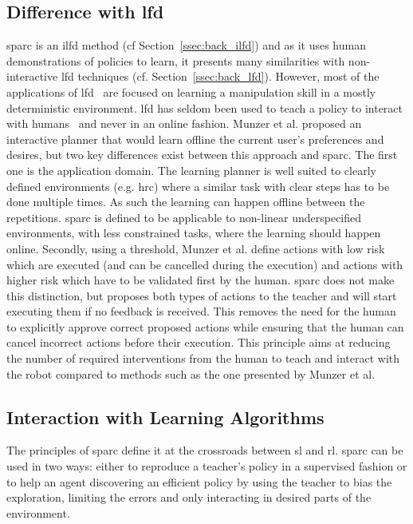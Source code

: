 \subsection{Difference with \gls{lfd}}

\gls{sparc} is an \gls{ilfd} method (cf Section~\ref{ssec:back_ilfd}) and as it uses human demonstrations of policies to learn, it presents many similarities with non-interactive \gls{lfd} techniques (cf. Section~\ref{ssec:back_lfd}). However, most of the applications of \gls{lfd}~\citep{argall2009survey,billard2008robot} are focused on learning a manipulation skill in a mostly deterministic environment. \gls{lfd} has seldom been used to teach a policy to interact with humans~\citep{liu2014train,sequeira2016discovering,munzer2017efficient} and never in an online fashion. Munzer et al. proposed an interactive planner that would learn offline the current user's preferences and desires, but two key differences exist between this approach and \gls{sparc}. The first one is the application domain. The learning planner is well suited to clearly defined environments (e.g. \gls{hrc}) where a similar task with clear steps has to be done multiple times. As such the learning can happen offline between the repetitions. \gls{sparc} is defined to be applicable to non-linear underspecified environments, with less constrained tasks, where the learning should happen online. Secondly, using a threshold, Munzer et al. define actions with low risk which are executed (and can be cancelled during the execution) and actions with higher risk which have to be validated first by the human. \gls{sparc} does not make this distinction, but proposes both types of actions to the teacher and will start executing them if no feedback is received. This removes the  need for the human to explicitly approve correct proposed actions while ensuring that the human can cancel incorrect actions before their execution. This principle aims at reducing the number of required interventions from the human to teach and interact with the robot compared to methods such as the one presented by Munzer et al. 

\subsection{Interaction with Learning Algorithms}

The principles of \gls{sparc} define it at the crossroads between \gls{sl} and \gls{rl}. \gls{sparc} can be used in two ways: either to reproduce a teacher's policy in a supervised fashion or to help an agent discovering an efficient policy by using the teacher to bias the exploration, limiting the errors and only interacting in desired parts of the environment.

